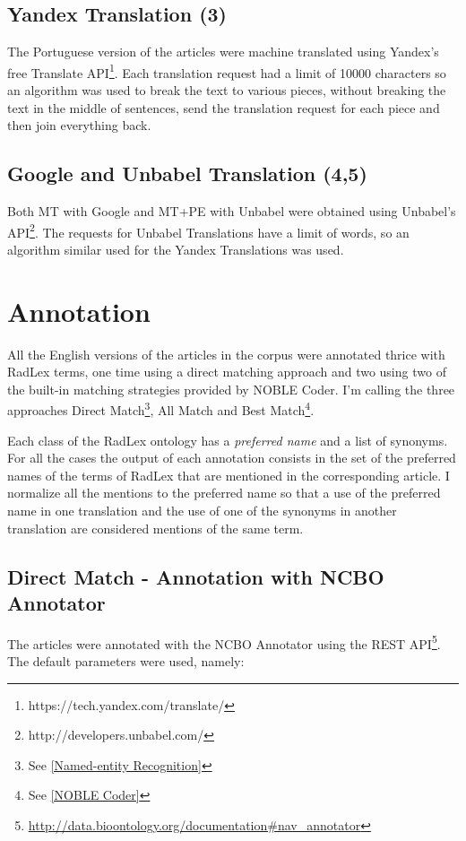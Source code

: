 \subsection{Yandex Translation (3)}

The Portuguese version of the articles were machine translated using Yandex's free Translate API\footnote{https://tech.yandex.com/translate/}. Each translation request had a limit of 10000 characters so an algorithm was used to break the text to various pieces, without breaking the text in the middle of sentences, send the translation request for each piece and then join everything back.

\subsection{Google and Unbabel Translation (4,5)}

Both MT with Google and MT+PE with Unbabel were obtained using Unbabel's API\footnote{http://developers.unbabel.com/}. The requests for Unbabel Translations have a limit of words, so an algorithm similar used for the Yandex Translations was used. 

\section{Annotation}

All the English versions of the articles in the corpus were annotated thrice with RadLex terms, one time using a direct matching approach and two using two of the built-in matching strategies provided by NOBLE Coder. I'm calling the three approaches Direct Match\footnote{See \ref{Named-entity Recognition}}, All Match and Best Match\footnote{See \ref{NOBLE Coder}}.

Each class of the RadLex ontology has a \textit{preferred name} and a list of synonyms. For all the cases the output of each annotation consists in the set of the preferred names of the terms of RadLex that are mentioned in the corresponding article. I normalize all the mentions to the preferred name so that a use of the preferred name in one translation and the use of one of the synonyms in another translation are considered mentions of the same term. 

\subsection{Direct Match - Annotation with NCBO Annotator}

The articles were annotated with the NCBO Annotator using the REST API\footnote{\url{http://data.bioontology.org/documentation\#nav_annotator}}. The default parameters were used, namely:

